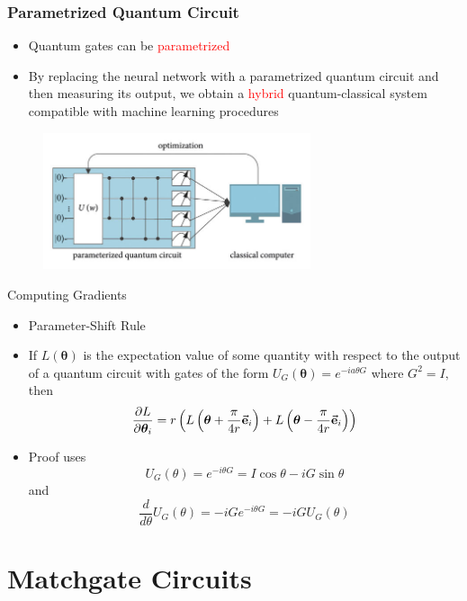 \documentclass[xcolor=dvipsnames]{beamer}
\begin{document}
\begin{frame}
  \frametitle{Parametrized Quantum Circuit}
  \begin{itemize}
    \item Quantum gates can be \textcolor{red}{parametrized}
    \item By replacing the neural network with a parametrized quantum circuit and then measuring its output, we obtain a \textcolor{red}{hybrid} quantum-classical system compatible with machine learning procedures
  \end{itemize}
  \begin{figure}
    \centering
    \includegraphics[width=0.7\textwidth]{pqc.png}
  \end{figure}
\end{frame}

\begin{frame}{Computing Gradients}
  \begin{itemize}
    \item Parameter-Shift Rule
    \item If $L(\bm{\theta})$ is the expectation value of some quantity with respect to the output of a quantum circuit with gates of the form $U_G(\bm{\theta})=e^{-ia\theta G}$ where $G^2=I,$ then
    \[\frac{\partial L}{\partial\bm{\theta}_i}=r\left(L\left(\bm{\theta}+\frac{\pi}{4r}\vec{\bf{e}}_i\right)+L\left(\bm{\theta}-\frac{\pi}{4r}\vec{\bf{e}}_i\right)\right)\]
    \item Proof uses 
    \[U_G(\theta)=e^{-i\theta G}=I\cos\theta-iG\sin\theta\]
    and 
    \[\frac{d}{d\theta}U_G(\theta)=-iGe^{-i\theta G}=-iGU_G(\theta)\]
  \end{itemize}
\end{frame}

\section{Matchgate Circuits}
\end{document}
